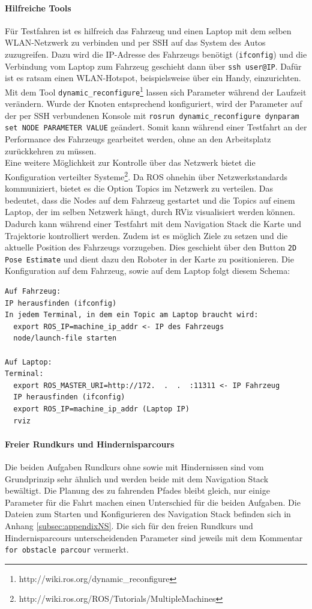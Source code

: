 \paragraph{Hilfreiche Tools}
F\"ur Testfahren ist es hilfreich das Fahrzeug und einen Laptop mit dem selben WLAN-Netzwerk zu verbinden und per SSH auf das System des Autos zuzugreifen. Dazu wird die IP-Adresse des Fahrzeugs ben\"otigt (\texttt{ifconfig}) und die Verbindung vom Laptop zum Fahrzeug geschieht dann \"uber \texttt{ssh user@IP}. Daf\"ur ist es ratsam einen WLAN-Hotspot, beispielsweise \"uber ein Handy, einzurichten.\\
Mit dem Tool \texttt{dynamic\_reconfigure}\footnote{http://wiki.ros.org/dynamic\_reconfigure} lassen sich Parameter w\"ahrend der Laufzeit ver\"andern. Wurde der Knoten entsprechend konfiguriert, wird der Parameter auf der per SSH verbundenen Konsole mit \texttt{rosrun dynamic\_reconfigure dynparam set NODE PARAMETER VALUE} ge\"andert. Somit kann w\"ahrend einer Testfahrt an der Performance des Fahrzeugs gearbeitet werden, ohne an den Arbeitsplatz zur\"uckkehren zu m\"ussen.\\
Eine weitere M\"oglichkeit zur Kontrolle \"uber das Netzwerk bietet die Konfiguration verteilter Systeme\footnote{http://wiki.ros.org/ROS/Tutorials/MultipleMachines}. Da ROS ohnehin \"uber Netzwerkstandards kommuniziert, bietet es die Option Topics im Netzwerk zu verteilen. Das bedeutet, dass die Nodes auf dem Fahrzeug gestartet und die Topics auf einem Laptop, der im selben Netzwerk h\"angt, durch RViz visualisiert werden k\"onnen. Dadurch kann w\"ahrend einer Testfahrt mit dem Navigation Stack die Karte und Trajektorie kontrolliert werden. Zudem ist es m\"oglich Ziele zu setzen und die aktuelle Position des Fahrzeugs vorzugeben. Dies geschieht \"uber den Button \texttt{2D Pose Estimate} und dient dazu den Roboter in der Karte zu positionieren. Die Konfiguration auf dem Fahrzeug, sowie auf dem Laptop folgt diesem Schema:
\begin{lstlisting}
Auf Fahrzeug: 
IP herausfinden (ifconfig) 
In jedem Terminal, in dem ein Topic am Laptop braucht wird:  
  export ROS_IP=machine_ip_addr <- IP des Fahrzeugs 
  node/launch-file starten

Auf Laptop: 
Terminal: 
  export ROS_MASTER_URI=http://172.  .  .  :11311 <- IP Fahrzeug
  IP herausfinden (ifconfig) 
  export ROS_IP=machine_ip_addr (Laptop IP) 
  rviz
\end{lstlisting}

\paragraph{Freier Rundkurs und Hindernisparcours}
Die beiden Aufgaben Rundkurs ohne sowie mit Hindernissen sind vom Grundprinzip sehr \"ahnlich und werden beide mit dem Navigation Stack bew\"altigt. Die Planung des zu fahrenden Pfades bleibt gleich, nur einige Parameter f\"ur die Fahrt machen einen Unterschied f\"ur die beiden Aufgaben. Die Dateien zum Starten und Konfigurieren des Navigation Stack befinden sich in Anhang \ref{subsec:appendixNS}. Die sich f\"ur den freien Rundkurs und Hindernisparcours unterscheidenden Parameter sind jeweils mit dem Kommentar \texttt{for obstacle parcour} vermerkt.

